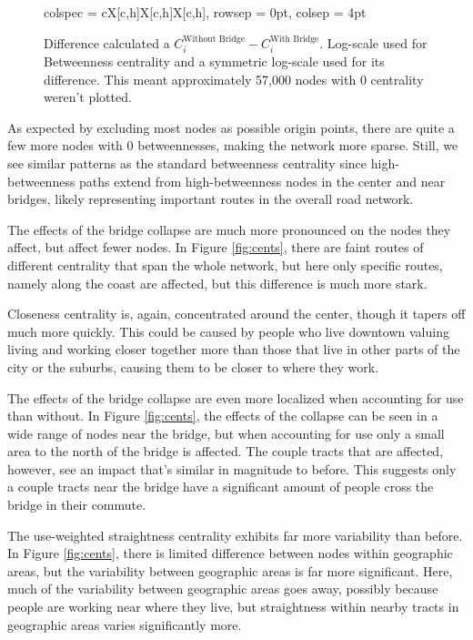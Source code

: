 \documentclass[11pt]{article}
\numberwithin{equation}{section} %
\numberwithin{figure}{section} %
\numberwithin{table}{section} %
\theoremstyle{definition}
\begin{document}
\begin{figure}[t!]
\begin{tblr}{%
    colspec = {cX[c,h]X[c,h]X[c,h]},
    rowsep = 0pt,
    colsep = 4pt
    }
  \end{tblr}
  {\footnotesize Difference calculated a $C_i^\text{Without Bridge} - C_i^\text{With Bridge}$. Log-scale used for Betweenness centrality and a symmetric log-scale used for its difference. This meant approximately 57,000 nodes with 0 centrality weren't plotted. \\}
  \label{fig:use_cents}
\end{figure}

As expected by excluding most nodes as possible origin points, there are quite a few more nodes with 0 betweennesses, making the network more sparse. Still, we see similar patterns as the standard betweenness centrality since high-betweenness paths extend from high-betweenness nodes in the center and near bridges, likely representing important routes in the overall road network.

The effects of the bridge collapse are much more pronounced on the nodes they affect, but affect fewer nodes. In Figure \ref{fig:cents}, there are faint routes of different centrality that span the whole network, but here only specific routes, namely along the coast are affected, but this difference is much more stark.

Closeness centrality is, again, concentrated around the center, though it tapers off much more quickly. This could be caused by people who live downtown valuing living and working closer together more than those that live in other parts of the city or the suburbs, causing them to be closer to where they work.

The effects of the bridge collapse are even more localized when accounting for use than without. In Figure \ref{fig:cents}, the effects of the collapse can be seen in a wide range of nodes near the bridge, but when accounting for use only a small area to the north of the bridge is affected. The couple tracts that are affected, however, see an impact that's similar in magnitude to before. This suggests only a couple tracts near the bridge have a significant amount of people cross the bridge in their commute.

The use-weighted straightness centrality exhibits far more variability than before. In Figure \ref{fig:cents}, there is limited difference between nodes within geographic areas, but the variability between geographic areas is far more significant. Here, much of the variability between geographic areas goes away, possibly because people are working near where they live, but straightness within nearby tracts in geographic areas varies significantly more.
\end{document}
